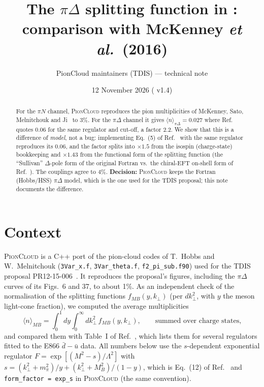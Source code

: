 \documentclass[11pt,a4paper]{article}
\title{\color{titleblue}The $\pi\Delta$ splitting function in \picloud{}:\\
comparison with McKenney \textit{et al.}\ (2016)}
\author{PionCloud maintainers (TDIS) --- technical note}
\date{12 November 2026 \quad (\picloud{} v1.4)}
\newcommand{\picloud}{\textsc{PionCloud}}
\newcommand{\kT}{k_\perp}
\begin{document}
\maketitle

\begin{abstract}
\noindent
For the $\pi N$ channel, \picloud{} reproduces the pion multiplicities of
McKenney, Sato, Melnitchouk and Ji~\cite{McK16} to 3\%.  For the $\pi\Delta$
channel it gives $\langle n\rangle_{\pi\Delta}=0.027$ where Ref.~\cite{McK16}
quotes 0.06 for the same regulator and cut-off, a factor 2.2.  We show that
this is a difference of \emph{model}, not a bug: implementing Eq.~(5) of
Ref.~\cite{McK16} with the same regulator reproduces its 0.06, and the factor
splits into $\times1.5$ from the isospin (charge-state) bookkeeping and
$\times1.43$ from the functional form of the splitting function (the
``Sullivan'' $\Delta$-pole form of the original Fortran vs.\ the chiral-EFT
on-shell form of Ref.~\cite{McK16}).  The couplings agree to 4\%.
\textbf{Decision:} \picloud{} keeps the Fortran (Hobbs/HSS) $\pi\Delta$ model,
which is the one used for the TDIS proposal; this note documents the
difference.
\end{abstract}

\section{Context}

\picloud{} is a C++ port of the pion-cloud codes of T.~Hobbs and
W.~Melnitchouk (\texttt{3Var\_x.f}, \texttt{3Var\_theta.f},
\texttt{f2\_pi\_sub.f90}) used for the TDIS proposal PR12-15-006~\cite{TDIS15}.
It reproduces the proposal's figures, including the $\pi\Delta$ curves of its
Figs.~6 and 37, to about 1\%.  As an independent check of the normalisation of
the splitting functions $f_{MB}(y,\kT)$ (per $d\kT^2$, with $y$ the meson
light-cone fraction), we computed the average multiplicities
\begin{equation}
  \langle n\rangle_{MB}=\int_0^1\!dy\int_0^\infty\! d\kT^2\, f_{MB}(y,\kT),
  \qquad\text{summed over charge states,}
\end{equation}
and compared them with Table~I of Ref.~\cite{McK16}, which lists them for
several regulators fitted to the E866 $\bar d-\bar u$ data.  All numbers below
use the $s$-dependent exponential regulator
$F=\exp[(M^2-s)/\Lambda^2]$ with $s=(\kT^2+m_\pi^2)/y+(\kT^2+M_B^2)/(1-y)$,
which is Eq.~(12) of Ref.~\cite{McK16} and \texttt{form\_factor = exp\_s} in
\picloud{} (the same convention).
\end{document}
